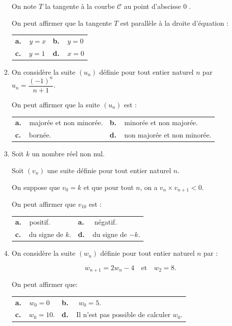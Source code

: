\begin{enumerate}
On note $T$ la tangente à la courbe $\mathcal{C}$ au point d'abscisse 0 .

On peut affirmer que la tangente $T$ est parallèle à la droite d'équation : 

\begin{center}
\begin{tabularx}{\linewidth}{*{2}{X}}
\textbf{a.~~}$y =x$ &\textbf{b.~~}$y = 0$\\
\textbf{c.~~}$y = 1$&\textbf{d.~~}$x = 0$
\end{tabularx}
\end{center}
\item On considère la suite $\left(u_n\right)$ définie pour tout entier naturel $n$ par $u_n = \dfrac{(-1)^n}{n+1}$.

On peut affirmer que la suite $\left(u_n\right)$ est : 

\begin{center}
\begin{tabularx}{\linewidth}{*{2}{X}}
\textbf{a.~~}majorée et non minorée.&\textbf{b.~~}minorée et non majorée.\\
\textbf{c.~~}bornée.				&\textbf{d.~~}non majorée et non minorée.
\end{tabularx}
\end{center}

\item Soit $k$ un nombre réel non nul.

Soit $\left(v_n\right)$  une suite définie pour tout entier naturel $n$.

On suppose que $v_0 = k$ et que pour tout $n$, on a $v_n \times v_{n+1} < 0$.

On peut affirmer que $v_{10}$ est :

\begin{center}
\begin{tabularx}{\linewidth}{*{2}{X}}
\textbf{a.~~}positif. &\textbf{a.~~} négatif.\\
\textbf{c.~~}du signe de $k$.&\textbf{d.~~}du signe de $- k$.
\end{tabularx}
\end{center}
\item On considère la suite $\left(w_n\right)$ définie pour tout entier naturel $n$ par : 

\[w_{n+1} = 2w_n - 4\quad \text{et}\quad  w_2 = 8.\]

On peut affirmer que:

\begin{center}
\begin{tabularx}{\linewidth}{*{2}{X}}
\textbf{a.~~}$w_0 = 0$&\textbf{b.~~} $w_0 = 5$.\\
\textbf{c.~~}$w_0 = 10$.&\textbf{d.~~}Il n'est pas possible de calculer $w_0$.
\end{tabularx}
\end{center}


\end{enumerate}
